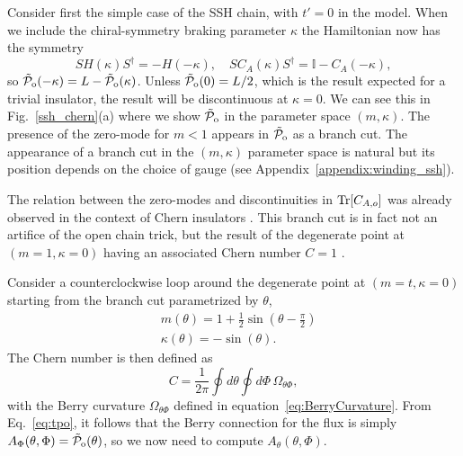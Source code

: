 \documentclass[twocolumn,amsmath,longbibliography,amssymb,superscriptaddress]{revtex4-1}
\newcommand{\tpo}{\tilde{\mathcal{P}}_{\rm o}}
\begin{document}
Consider first the simple case of the SSH chain, with $t'=0$ in the model. When we include the chiral-symmetry braking parameter $\kappa$ the Hamiltonian now has the symmetry
\begin{equation}
SH(\kappa)S^\dagger = -H(-\kappa), \quad S C_A(\kappa) S^\dagger = \mathbb{I}-C_A(-\kappa),
\end{equation}
so $\tpo(-\kappa) = L-\tpo(\kappa)$. Unless $\tpo(0) = L/2$, which is the result expected for a trivial insulator, the result will be discontinuous at $\kappa = 0$. We can see this in Fig.~\ref{ssh_chern}(a) where we show $\tpo$ in the parameter space $(m,\kappa)$. The presence of the zero-mode for $m<1$ appears in $\tpo$ as a branch cut. The appearance of a branch cut in the $(m,\kappa)$ parameter space is natural but its position depends on the choice of gauge (see Appendix~\ref{appendix:winding_ssh}).

The relation between the zero-modes and discontinuities in $\Tr[C_{A,o}]$ was already observed in the context of Chern insulators \cite{Alexandrinata2011}. This branch cut is in fact not an artifice of the open chain trick, but the result of the degenerate point at $(m=1,\kappa=0)$ having an associated Chern number $C=1$ \cite{Asboth2016}.

Consider a counterclockwise loop around the degenerate point at $(m=t,\kappa=0)$ starting from the branch cut parametrized by $\theta$,
\begin{align*}
& m(\theta) = 1+\frac{1}{2}\sin(\theta-\frac{\pi}{2}) \\
& \kappa(\theta) = -\sin(\theta).
\end{align*}
The Chern number is then defined as
\begin{equation}
C = \frac{1}{2\pi}\oint d\theta\oint d\Phi \, \Omega_{\theta\Phi},
\label{eq:chern}
\end{equation} 
with the Berry curvature $\Omega_{\theta\Phi}$ defined in equation~\eqref{eq:BerryCurvature}. 
From  Eq.~\eqref{eq:tpo}, it follows that the Berry connection for the flux is simply $A_\Phi(\theta,\Phi) = \tpo(\theta)$, so we now need to compute $A_\theta(\theta,\Phi)$. 
\end{document}
